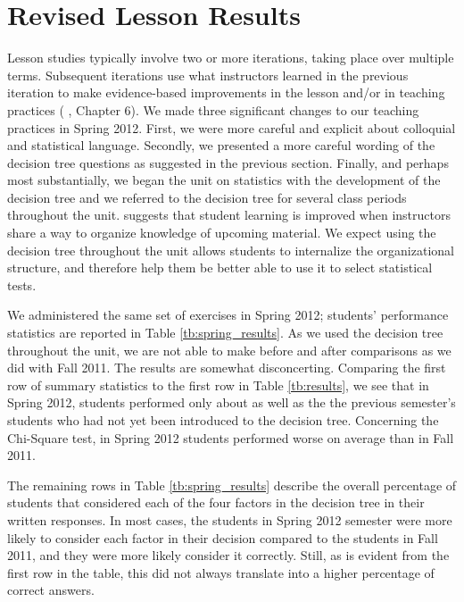 \documentclass[12pt]{article}
\begin{document}
\section{Revised Lesson Results}
Lesson studies typically involve two or more iterations, taking place over multiple terms.  Subsequent iterations use what instructors learned in the previous iteration to make evidence-based improvements in the lesson and/or in teaching practices (\citeauthor{cerbinbook} \citeyear{cerbinbook}, Chapter 6).  We made three significant changes to our teaching practices in Spring 2012.  First, we were more careful and explicit about colloquial and statistical language.  Secondly, we presented a more careful wording of the decision tree questions as suggested in the previous section.  Finally, and perhaps most substantially, we began the unit on statistics with the development of the decision tree and we referred to the decision tree for several class periods throughout the unit.  \citet{ausubel1978} suggests that student learning is improved when instructors share a way to organize knowledge of upcoming material.  We expect using the decision tree throughout the unit allows students to internalize the organizational structure, and therefore help them be better able to use it to select statistical tests.

We administered the same set of exercises in Spring 2012; students' performance statistics are reported in Table \ref{tb:spring_results}.  As we used the decision tree throughout the unit, we are not able to make before and after comparisons as we did with Fall 2011.  The results are somewhat disconcerting.  Comparing the first row of summary statistics to the first row in Table \ref{tb:results}, we see that in Spring 2012, students performed only about as well as the the previous semester's students who had not yet been introduced to the decision tree.   Concerning the Chi-Square test, in Spring 2012 students performed worse on average than in Fall 2011.

The remaining rows in Table \ref{tb:spring_results} describe the overall percentage of students that considered each of the four factors in the decision tree in their written responses.  In most cases, the students in Spring 2012 semester were more likely to consider each factor in their decision compared to the students in Fall 2011, and they were more likely consider it correctly.  Still, as is evident from the first row in the table, this did not always translate into a higher percentage of correct answers. 
\end{document}
